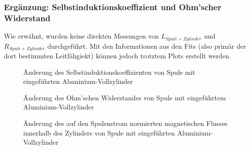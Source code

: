 {\begin{minipage}[t]{0.33\textwidth}
        
	\end{minipage}%
	\begin{minipage}[t]{0.67\textwidth}
        \vspace{0mm}
        \resizebox{.95\textwidth}{!}{}
        \label{fig:alu:rad:approx:high}
	\end{minipage}

\clearpage
}


\subsubsection{Erg\"anzung: Selbstinduktionskoeffizient und Ohm'scher Widerstand}
\label{sec:ausw:subsec:vollz:subsubsec:LR}

Wie erw\"ahnt, wurden keine direkten  Messungen von $L_{Spule + Zylinder}$ und
$R_{Spule  + Zylinder}$  durchgef\"uhrt. Mit  den Informationen  aus den  Fits
(also prim\"ar  der dort  bestimmten Leitf\"ahgiekt) k\"onnen  jedoch trotztem
Plots erstellt werden.


\begin{figure}[h!]
    \resizebox{\textwidth}{!}{}
    \caption{\"Anderung des Selbstinduktionskoeffizienten von Spule mit eingef\"uhrten Aluminium-Vollzylinder}
    \label{fig:alu:freq:L}
\end{figure}

\begin{figure}[h!]
    \resizebox{\textwidth}{!}{}
    \caption{\"Anderung des Ohm'schen Widerstandes von Spule mit eingef\"uhrtem Aluminium-Vollzylinder}
    \label{fig:alu:freq:R}
\end{figure}

\begin{figure}[h!]
    \resizebox{\textwidth}{!}{}
    \caption{\"Anderung des auf den Spulenstrom normierten magnetischen Flusses innerhalb des Zylinders von Spule mit eingef\"uhrten Aluminium-Vollzylinder}
    \label{fig:alu:freq:phi}
\end{figure}



